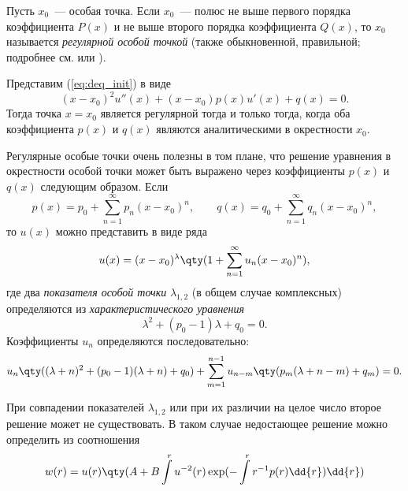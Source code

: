 \documentclass[\docroot/reports/draft/report.tex]{subfiles}
\begin{document}
    Пусть $x_0$~--- особая точка. Если $x_0$~--- полюс не выше первого порядка коэффициента $P(x)$ и не выше второго порядка коэффициента $Q(x)$, то $x_0$ называется \textit{регулярной особой точкой} (также обыкновенной, правильной; подробнее см. \cite{whittaker_watson_1} или \cite{fedoryuk_de}).

    Представим (\ref{eq:deq_init}) в виде
    \begin{equation}\label{eq:deq_init}
        (x - x_0)^2 u''(x) + (x - x_0) p(x) u'(x) + q(x) = 0.
    \end{equation}
    Тогда точка $x = x_0$ является регулярной тогда и только тогда, когда оба коэффициента $p(x)$ и $q(x)$ являются аналитическими в окрестности $x_0$.

    Регулярные особые точки очень полезны в том плане, что решение уравнения в окрестности особой точки может быть выражено через коэффициенты $p(x)$ и $q(x)$ следующим образом. Если
    \begin{equation*}
        p(x) = p_0 + \sum\limits_{n=1}^\infty p_n (x - x_0)^n, \qquad
        q(x) = q_0 + \sum\limits_{n=1}^\infty q_n (x - x_0)^n,
    \end{equation*}
    то $u(x)$ можно представить в виде ряда
    \begin{equation*}
        u(x) = (x - x_0)^\lambda \qty(1 + \sum\limits_{n=1}^\infty u_n (x - x_0)^n),
    \end{equation*}
    где два \textit{показателя особой точки} $\lambda_{1,2}$ (в общем случае комплексных) определяются из \textit{характеристического уравнения}
    \begin{equation*}
        \lambda^2 + (p_0 - 1) \lambda + q_0 = 0.
    \end{equation*}
    Коэффициенты $u_n$ определяются последовательно:
    \begin{equation}\label{eq:deq_coefs}
        u_n \qty((\lambda + n)^2 + (p_0 - 1) (\lambda + n) + q_0) +
            \sum\limits_{m = 1}^{n - 1} u_{n - m} \qty(p_m (\lambda + n - m) + q_m) = 0 .
    \end{equation}

    При совпадении показателей $\lambda_{1,2}$ или при их различии на целое число второе решение может не существовать. В таком случае недостающее решение можно определить из соотношения
    \begin{equation}\label{eq:deq_alt_sln}
        w(r) = u(r) \qty(A + B \int\limits^r u^{-2}(r) \exp(- \int\limits^r r^{-1} p(r) \dd{r}) \dd{r})
    \end{equation}

\end{document}
